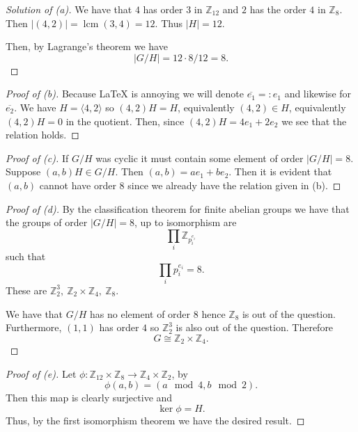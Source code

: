 \begin{proof}[Solution of (a)]
    We have that $4$ has order $3$ in $\mathbb Z_{12}$ and 
    $2$ has the order $4$ in $\mathbb Z_8$.
    Then $|(4,2)| = \operatorname{lcm}(3,4) = 12$. 
    Thus $|H| = 12$. 

    Then, by Lagrange's theorem we have 
    \[
        |G/H| = 12 \cdot 8 / 12 = 8.
    \]
\end{proof}
\begin{proof}[Proof of (b)]
    Because LaTeX is annoying we will denote 
    $\overline{e_1} =: e_1$ and likewise for $\overline{e_2}$. 
    We have $H = \langle 4,2 \rangle$ so 
    $(4,2) H = H$, equivalently $(4,2) \in H$, equivalently 
    $(4,2)H = 0$ in the quotient. Then, since $(4,2)H = 
    4e_1 + 2e_2$ we see that the relation holds.
\end{proof}
\begin{proof}[Proof of (c)]
    If $G/H$ was cyclic it must contain some element of 
    order $|G/H| = 8$. Suppose $(a,b)H \in G/H$.  
    Then $(a,b) = ae_1 + be_2$. Then it is evident that 
    $(a,b)$ cannot have order $8$ since we already have the 
    relation given in (b).
\end{proof}
\begin{proof}[Proof of (d)]
    By the classification theorem for finite abelian groups we have 
    that the groups of order $|G/H| = 8$, up to isomorphism are 
    \[
        \prod_{i}\mathbb Z_{p_i^{e_i}}
    \]
    such that 
    \[
        \prod_{i} p_i^{e_i} = 8.
    \]
    These are $\mathbb Z_2^3, \ \mathbb Z_2 \times \mathbb Z_4, \ 
    \mathbb Z_8$.
    
    We have that $G/H$ has no element of order $8$ hence 
    $\mathbb Z_8$ is out of the question. 
    Furthermore, $(1,1)$ has order $4$ so $\mathbb Z_2^3$ is also 
    out of the question. Therefore 
    \[
        G \cong \mathbb Z_2 \times \mathbb Z_4.
    \]
\end{proof}
\begin{proof}[Proof of (e)]
    Let $\phi : \mathbb Z_{12} \times \mathbb Z_8 
    \to \mathbb Z_4 \times \mathbb Z_2$, by 
    \[
        \phi(a,b) = (a \mod 4, b \mod 2). 
    \]
    Then this map is clearly surjective and 
    \[
        \ker \phi = H. 
    \]
    Thus, by the first isomorphism theorem we have the desired 
    result.
\end{proof}

